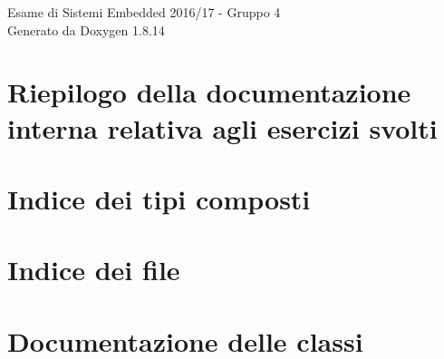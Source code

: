 \documentclass[twoside]{book}
\newcommand{\+}{\discretionary{\mbox{\scriptsize$\hookleftarrow$}}{}{}}
\newcommand{\clearemptydoublepage}{%
  \newpage{\pagestyle{empty}\cleardoublepage}%
}
\begin{document}
\hypersetup{pageanchor=false,
             bookmarksnumbered=true,
             pdfencoding=unicode
            }
\begin{titlepage}
\vspace*{7cm}
\begin{center}%
{\Large Esame di Sistemi Embedded 2016/17 -\/ Gruppo 4 }\\
\vspace*{1cm}
{\large Generato da Doxygen 1.8.14}\\
\end{center}
\end{titlepage}
\clearemptydoublepage
{}
\tableofcontents
\clearemptydoublepage
{}
\hypersetup{pageanchor=true}

\chapter{Riepilogo della documentazione interna relativa agli esercizi svolti}
\label{index}\hypertarget{index}{}
\chapter{Indice dei tipi composti}

\chapter{Indice dei file}

\chapter{Documentazione delle classi}


\end{document}
